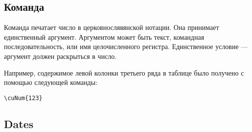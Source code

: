 \begin{RU}
\subsection{Команда }
Команда печатает число в церковнослявянской нотации.
Она принимает единственный аргумент. Аргументом может быть текст, командная последовательность, или имя 
целочисленного регистра. Единственное условие --- аргумент должен раскрыться в число.

Например, содержимое левой колонки третьего ряда в таблице было получено с помощью
следующей команды:
\begin{verbatim}
\cuNum{123}
\end{verbatim}
\end{RU}

\begin{EN}
\section{Dates}
\subsection{}
\subsection{}
\subsection{}
\subsection{}
\subsection{}
\subsection{}
\end{EN}

